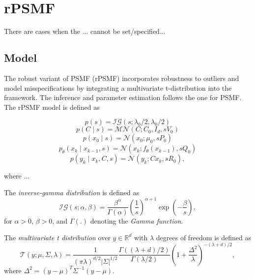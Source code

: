 \documentclass{mldsmsc}
\begin{document}
\section{rPSMF}

There are cases when the ... cannot be set/specified...

\subsection{Model}

The robust variant of PSMF (rPSMF) incorporates robustness to outliers and model misspecifications by integrating a multivariate t-distribution into the framework. The inference and parameter estimation follows the one for PSMF. The rPSMF model is defined as

\begin{equation}
    p(s) = \mathcal{IG}(s; \lambda_0 / 2, \lambda_0 / 2)
\end{equation}
\begin{equation}
    p(C \mid s) = \mathcal{MN}(C; C_0, I_d, sV_0)
\end{equation}
\begin{equation}
    p(x_0 \mid s) = \mathcal{N}(x_0; \mu_0, sP_0)
\end{equation}
\begin{equation}
    p_{\theta}(x_k \mid x_{k-1}, s) = \mathcal{N}(x_k; f_{\theta}(x_{k-1}), sQ_0)
\end{equation}
\begin{equation}
    p(y_k \mid x_k, C, s) = \mathcal{N}(y_k; Cx_k, sR_0),
\end{equation}

\noindent where ...

\begin{definition}
    The \textit{inverse-gamma distribution} is defined as
    \begin{equation}
        \mathcal{IG}(s; \alpha, \beta) = \frac{\beta ^ \alpha}{\Gamma(\alpha)} \left(\frac{1}{s}\right)^{\alpha + 1} \exp \left(-\frac{\beta}{s}\right),
    \end{equation}
    for $\alpha > 0$, $\beta > 0$, and $\Gamma(.)$ denoting the \textit{Gamma function}.
\end{definition}

\begin{definition}
    The \textit{multivariate t distribution} over $y \in \mathbb{R}^{d}$ with $\lambda$ degrees of freedom is defined as
    \begin{equation}
        \mathcal{T}(y; \mu, \Sigma, \lambda) = \frac{1}{(\pi \lambda)^{d/2} |\Sigma|^{1/2}} \frac{\Gamma((\lambda + d)/2)}{\Gamma(\lambda / 2)} \left(1 + \frac{\Delta^2}{\lambda}\right)^{-(\lambda + d) / 2},
    \end{equation}
    where $\Delta^2 = (y - \mu)^T \Sigma^{-1} (y-\mu)$.
\end{definition}
\end{document}
